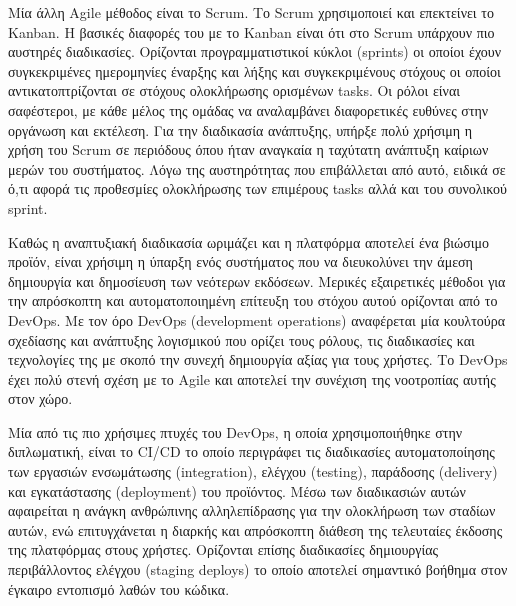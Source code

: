 Μία άλλη Agile μέθοδος είναι το Scrum. Το Scrum χρησιμοποιεί και επεκτείνει το Kanban. Η βασικές διαφορές του με το Kanban είναι ότι στο Scrum υπάρχουν πιο αυστηρές διαδικασίες. Ορίζονται προγραμματιστικοί κύκλοι (sprints) οι οποίοι έχουν συγκεκριμένες ημερομηνίες έναρξης και λήξης και συγκεκριμένους στόχους οι οποίοι αντικατοπτρίζονται σε στόχους ολοκλήρωσης ορισμένων tasks. Οι ρόλοι είναι σαφέστεροι, με κάθε μέλος της ομάδας να αναλαμβάνει διαφορετικές ευθύνες στην οργάνωση και εκτέλεση. Για την διαδικασία ανάπτυξης, υπήρξε πολύ χρήσιμη η χρήση του Scrum σε περιόδους όπου ήταν αναγκαία η ταχύτατη ανάπτυξη καίριων μερών του συστήματος. Λόγω της αυστηρότητας που επιβάλλεται από αυτό, ειδικά σε ό,τι αφορά τις προθεσμίες ολοκλήρωσης των επιμέρους tasks αλλά και του συνολικού sprint.

Καθώς η αναπτυξιακή διαδικασία ωριμάζει και η πλατφόρμα αποτελεί ένα βιώσιμο προϊόν, είναι χρήσιμη η ύπαρξη ενός συστήματος που να διευκολύνει την άμεση δημιουργία και δημοσίευση των νεότερων εκδόσεων. Μερικές εξαιρετικές μέθοδοι για την απρόσκοπτη και αυτοματοποιημένη επίτευξη του στόχου αυτού ορίζονται από το DevOps. Με τον όρο DevOps (development operations) αναφέρεται μία κουλτούρα σχεδίασης και ανάπτυξης λογισμικού που ορίζει τους ρόλους, τις διαδικασίες και τεχνολογίες της με σκοπό την συνεχή δημιουργία αξίας για τους χρήστες. Το DevOps έχει πολύ στενή σχέση με το Agile και αποτελεί την συνέχιση της νοοτροπίας αυτής στον χώρο.

Μία από τις πιο χρήσιμες πτυχές του DevOps, η οποία χρησιμοποιήθηκε στην διπλωματική, είναι το CI/CD το οποίο περιγράφει τις διαδικασίες αυτοματοποίησης των εργασιών ενσωμάτωσης (integration), ελέγχου (testing), παράδοσης (delivery) και εγκατάστασης (deployment) του προϊόντος. Μέσω των διαδικασιών αυτών αφαιρείται η ανάγκη ανθρώπινης αλληλεπίδρασης για την ολοκλήρωση των σταδίων αυτών, ενώ επιτυγχάνεται η διαρκής και απρόσκοπτη διάθεση της τελευταίες έκδοσης της πλατφόρμας στους χρήστες. Ορίζονται επίσης διαδικασίες δημιουργίας περιβάλλοντος ελέγχου (staging deploys) το οποίο αποτελεί σημαντικό βοήθημα στον έγκαιρο εντοπισμό λαθών του κώδικα.
